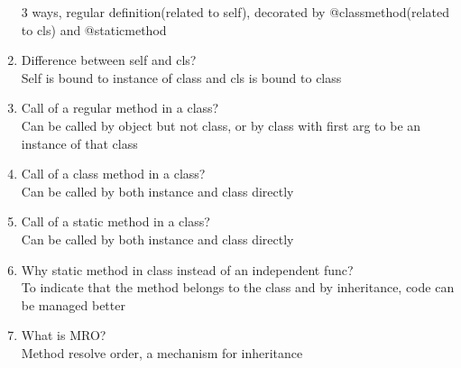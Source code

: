 \documentclass[10pt,a4paper,oneside]{article}
\begin{document}
\begin{enumerate}[1.]
3 ways, regular definition(related to self), decorated by @classmethod(related to cls) and @staticmethod
\item Difference between self and cls?\\
Self is bound to instance of class and cls is bound to class
\item Call of a regular method in a class?\\
Can be called by object but not class, or by class with first arg to be an instance of that class
\item Call of a class method in a class?\\
Can be called by both instance and class directly
\item Call of a static method in a class?\\
Can be called by both instance and class directly
\item Why static method in class instead of an independent func?\\
To indicate that the method belongs to the class and by inheritance, code can be managed better
\item What is MRO?\\
Method resolve order, a mechanism for inheritance
\end{enumerate}
\end{document}
